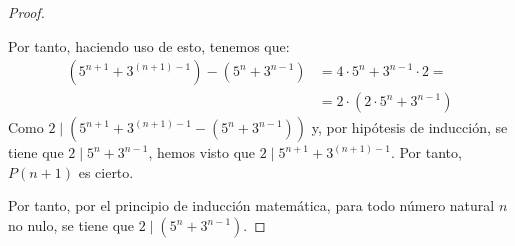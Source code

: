 \begin{ejercicio}
\begin{proof}
\begin{itemize}
                Por tanto, haciendo uso de esto, tenemos que:
                \begin{align*}
                    \left(5^{n+1} + 3^{(n+1)-1}\right) - \left(5^n + 3^{n-1}\right) &=
                     4 \cdot 5^n + 3^{n-1}\cdot 2 =\\
                    &= 2 \cdot \left(2\cdot 5^n + 3^{n-1}\right)
                \end{align*}
                Como $2\mid \left(5^{n+1} + 3^{(n+1)-1} - \left(5^n + 3^{n-1}\right)\right)$ y, por hipótesis de inducción, se tiene que  $2\mid 5^n + 3^{n-1}$, hemos visto que $2\mid 5^{n+1} + 3^{(n+1)-1}$.
                Por tanto, $P(n+1)$ es cierto. 
                
            \end{itemize}
            Por tanto, por el principio de inducción matemática, para todo número natural $n$ no nulo, se tiene que $2\mid \left(5^n + 3^{n-1}\right)$.
    \end{proof}
\end{ejercicio}


